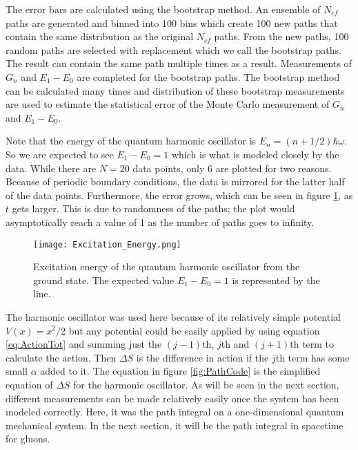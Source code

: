 \documentclass[11pt]{article}
\begin{document}
The error bars are calculated using the bootstrap method. An ensemble of $N_{cf}$ paths are generated and binned into 100 bins which create 100 new paths that contain the same distribution as the original $N_{cf}$ paths. From the new paths, 100 random paths are selected with replacement which we call the bootstrap paths. The result can contain the same path multiple times as a result. Measurements of $G_n$ and $E_1-E_0$ are completed for the bootstrap paths. The bootstrap method can be calculated many times and distribution of these bootstrap measurements are used to estimate the statistical error of the Monte Carlo measurement of $G_n$ and $E_1-E_0$.

Note that the energy of the quantum harmonic oscillator is $E_n=(n+1/2)\hbar\omega$. So we are expected to see $E_1-E_0=1$ which is what is modeled closely by the data. While there are $N=20$ data points, only 6 are plotted for two reasons. Because of periodic boundary conditions, the data is mirrored for the latter half of the data points. Furthermore, the error grows, which can be seen in figure \ref{fig:ExciteE}, as $t$ gets larger. This is due to randomness of the paths; the plot would asymptotically reach a value of 1 as the number of paths goes to infinity.

\begin{figure}[h]
	\centering
	\texttt{[image: Excitation\_Energy.png]}
	\caption{Excitation energy of the quantum harmonic oscillator from the ground state. The expected value $E_1-E_0=1$ is represented by the line.}
	\label{fig:ExciteE}
\end{figure}

The harmonic oscillator was used here because of its relatively simple potential $V(x)=x^2/2$ but any potential could be easily applied by using equation \ref{eq:ActionTot} and summing just the $(j-1)$th, $j$th and $(j+1)$th term to calculate the action. Then $\Delta S$ is the difference in action if the $j$th term has some small $\alpha$ added to it. The equation in figure \ref{fig:PathCode} is the simplified equation of $\Delta S$ for the harmonic oscillator. As will be seen in the next section, different measurements can be made relatively easily once the system has been modeled correctly. Here, it was the path integral on a one-dimensional quantum mechanical system. In the next section, it will be the path integral in spacetime for gluons.
\end{document}
